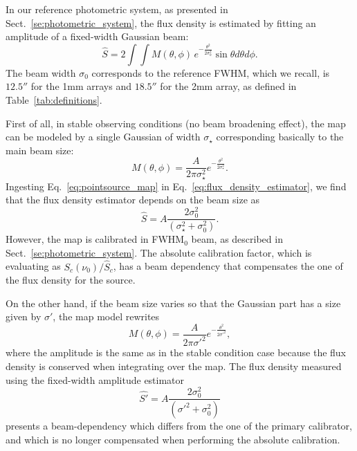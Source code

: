 In our reference photometric system, as presented in
Sect.~\ref{se:photometric_system}, 
the flux density is estimated by fitting an amplitude of a fixed-width
Gaussian beam:
\begin{equation}
  \hat{S}  = 2 \int \int M(\theta, \phi)\, e^{-\frac{\theta^{2}}{2\sigma_{0}^{2}}} \sin \theta d\theta d\phi.
  \label{eq:flux_density_estimator}
\end{equation}
The beam width $\sigma_{0}$ corresponds to the
reference FWHM, which we recall, is $12.5''$ for the 1mm arrays and $18.5''$ for
the 2mm array, as defined in Table~\ref{tab:definitions}.

First of all, in stable observing conditions (no beam
broadening effect), the map can be modeled by a single Gaussian of
width $\sigma_\star$ corresponding basically to the main beam size:
\begin{equation}
  M(\theta, \phi) = \frac{A}{2 \pi \sigma_\star^{2}} e^{-\frac{\theta^{2}}{2\sigma_\star^{2}}}.
  \label{eq:pointsource_map}
\end{equation}
Ingesting Eq.~\ref{eq:pointsource_map} in
Eq.~\ref{eq:flux_density_estimator}, we find that the flux density
estimator depends on the beam size as
\begin{equation}
  \hat{S}  = A \frac{2 \sigma_0^2}{(\sigma_{\star}^2 + \sigma_0^2)}.
\end{equation}
However, the map is calibrated in FWHM$_0$ beam, as described in
Sect.~\ref{se:photometric_system}. The absolute calibration factor,
which is evaluating as
$S_{c}(\nu_{0})/\hat{S}_{c}$, has a beam dependency that
compensates the one of the flux density for the source.

On the other hand, if the beam size varies so that the Gaussian part has a size given by
$\sigma'$, the map model rewrites  
\begin{equation}
  M(\theta, \phi) = \frac{A}{2 \pi \sigma'^{2}} e^{-\frac{\theta^{2}}{2\sigma'^{2}}},
  \label{eq:broader_beam_map}
\end{equation}
where the amplitude is the same as in the stable condition case
because the flux density is conserved when integrating over the map. 
The flux density measured using the fixed-width amplitude estimator 
\begin{equation}
  \hat{S'}  = A \frac{2 \sigma_0^2}{(\sigma'^2 + \sigma_0^2)}
\end{equation}
presents a beam-dependency which differs from the one of the primary
calibrator, and which is no longer compensated when performing the
absolute calibration.

